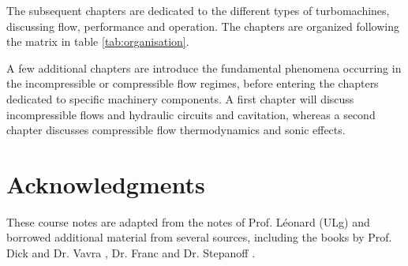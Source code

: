 The subsequent chapters are dedicated to the different types of
turbomachines, discussing flow, performance and operation. The
chapters are organized following the matrix in table
\ref{tab:organisation}.
\begin{table}[!h]
\caption{Organisation of chapters dedicated to turbomachinery components.}
\label{tab:organisation}
\end{table}
A few additional chapters are introduce the fundamental phenomena
occurring in the incompressible or compressible flow regimes, before
entering the chapters dedicated to specific machinery components. A
first chapter will discuss incompressible flows and hydraulic circuits
and cavitation, whereas a second chapter discusses compressible flow
thermodynamics and sonic effects.

\section{Acknowledgments}

These course notes are adapted from the notes of Prof. L{\'e}onard (ULg) and borrowed additional material from several sources, including the books by Prof. Dick \cite{EDick} and Dr. Vavra \cite{Vavra}, Dr. Franc \etal \cite{LaCavitation} and Dr. Stepanoff \cite{Stepanoff}.


